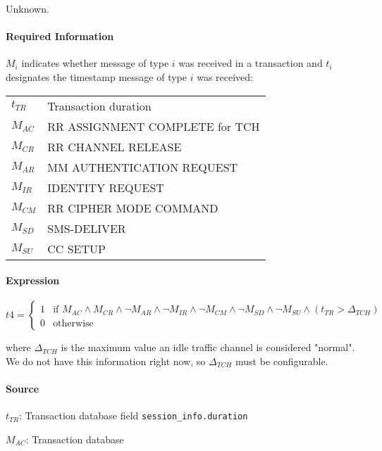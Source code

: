 \documentclass[a4paper,11pt,notitlepage,bigheadings,oneside]{scrartcl}
\begin{document}
Unknown.

\paragraph{Required Information}

$M_i$ indicates whether message of type $i$ was received in a transaction and
$t_i$ designates the timestamp message of type $i$ was received:

\begin{tabular}{ll}
\hline
$t_{TR}$ & Transaction duration \\
$M_{AC}$ & RR ASSIGNMENT COMPLETE for TCH \\
$M_{CR}$ & RR CHANNEL RELEASE \\
$M_{AR}$ & MM AUTHENTICATION REQUEST \\
$M_{IR}$ & IDENTITY REQUEST \\
$M_{CM}$ & RR CIPHER MODE COMMAND \\
$M_{SD}$ & SMS-DELIVER \\
$M_{SU}$ & CC SETUP \\
\hline
\end{tabular}


\paragraph{Expression}

$t4 =
\begin{cases}
	1 & \text{if } M_{AC} \wedge M_{CR} \wedge \neg M_{AR} \wedge \neg M_{IR} \wedge \neg M_{CM} \wedge \neg M_{SD} \wedge \neg M_{SU} \wedge (t_{TR} > \Delta_{TCH}) \\
	0 & \text{otherwise}
\end{cases}$

where $\Delta_{TCH}$ is the maximum value an idle traffic channel is considered
"normal". We do not have this information right now, so $\Delta_{TCH}$ must be
configurable.

\paragraph{Source}

$t_{TR}$: Transaction database field \verb|session_info.duration|

$M_{AC}$: Transaction database

\end{document}

